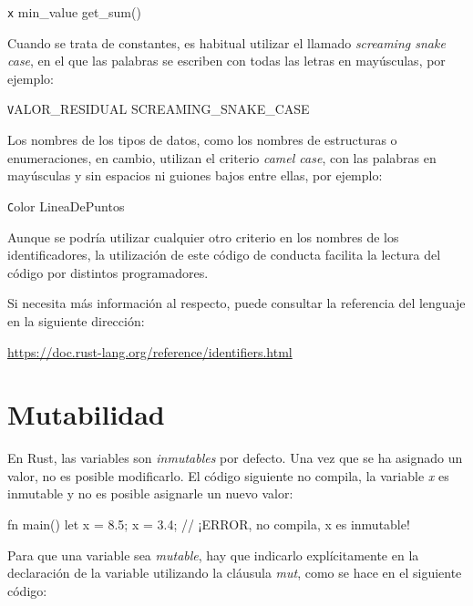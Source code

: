 {\centering \texttt x \hspace{2em} min\_value \hspace{2em} get\_sum()\par}

Cuando se trata de constantes, es habitual utilizar el llamado \textit{screaming snake case}, en el que las palabras se escriben con todas las letras en mayúsculas, por ejemplo:

{\centering \texttt VALOR\_RESIDUAL \hspace{2em} SCREAMING\_SNAKE\_CASE \par}

Los nombres de los tipos de datos, como los nombres de estructuras o enumeraciones, en cambio, utilizan el criterio \textit{camel case}, con las palabras en mayúsculas y sin espacios ni guiones bajos entre ellas, por ejemplo:

{\centering \texttt Color \hspace{2em} LineaDePuntos \par}

Aunque se podría utilizar cualquier otro criterio en los nombres de los identificadores, la utilización de este código de conducta facilita la lectura del código por distintos programadores.

Si necesita más información al respecto, puede consultar la referencia del lenguaje en la siguiente dirección:

{\centering \small \url{https://doc.rust-lang.org/reference/identifiers.html} \par}

\section{Mutabilidad}
En Rust, las variables son \textit{inmutables} por defecto. Una vez que se ha asignado un valor, no es posible modificarlo. El código siguiente no compila, la variable \textit{x} es inmutable y no es posible asignarle un nuevo valor:

\vspace{0.7em}
\begin{Codigo}
fn main() {
   let x = 8.5;
   x = 3.4; // ¡ERROR, no compila, x es inmutable!
}
\end{Codigo}


Para que una variable sea \textit{mutable}, hay que indicarlo explícitamente en la declaración de la variable utilizando la cláusula \textit{mut}, como se hace en el siguiente código:

